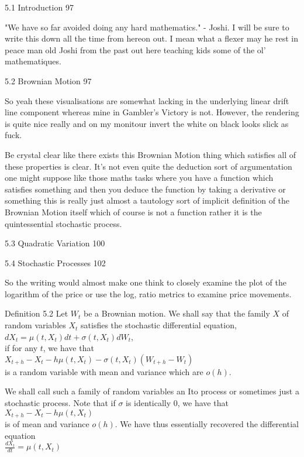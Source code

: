 5.1 Introduction 97

"We have so far avoided doing any hard mathematics." - Joshi. I will be sure to write this down all the time from hereon out. I mean what a flexer may he rest in peace man old Joshi from the past out here teaching kids some of the ol' mathematiques.

5.2 Brownian Motion 97

So yeah these visualisations are somewhat lacking in the underlying linear drift line component whereas mine in Gambler's Victory is not. However, the rendering is quite nice really and on my monitour invert the white on black looks slick as fuck.

Be crystal clear like there exists this Brownian Motion thing which satisfies all of these properties is clear. It's not even quite the deduction sort of argumentation one might suppose like those maths tasks where you have a function which satisfies something and then you deduce the function by taking a derivative or something this is really just almost a tautology sort of implicit definition of the Brownian Motion itself which of course is not a function rather it is the quintessential stochastic process.

5.3 Quadratic Variation 100



5.4 Stochastic Processes 102

So the writing would almost make one think to closely examine the plot of the logarithm of the price or use the log, ratio metrics to examine price movements.

Definition 5.2 Let $W_t$ be a Brownian motion. We shall say that the family $X$ of random variables $X_t$ satisfies the stochastic differential equation, \\
$dX_t = \mu (t,X_t) dt + \sigma (t,X_t) dW_t$, \\
if for any $t$, we have that \\
$X_{t+h}-X_t-h \mu(t,X_t) - \sigma (t,X_t) (W_{t+h}-W_t)$ \\
is a random variable with mean and variance which are $o(h)$.

We shall call such a family of random variables an Ito process or sometimes just a stochastic process. Note that if $\sigma$ is identically $0$, we have that \\
$X_{t+h}-X_t-h \mu (t,X_t)$ \\
is of mean and variance $o(h)$. We have thus essentially recovered the differential equation \\
$\frac{dX_t}{dt}=\mu (t,X_t)$

